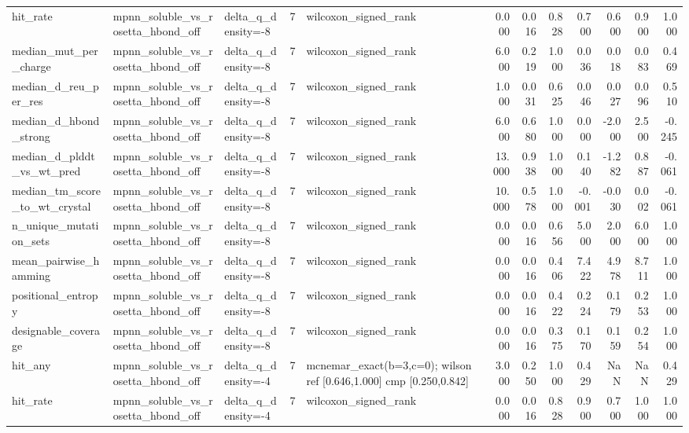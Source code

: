 \begin{table}
{\begin{tabular}{lllrlrrrrrrr}
hit\_rate & mpnn\_soluble\_vs\_rosetta\_hbond\_off & delta\_q\_density=-8 & 7 & wilcoxon\_signed\_rank & 0.000 & 0.016 & 0.828 & 0.700 & 0.600 & 0.900 & 1.000 \\
median\_mut\_per\_charge & mpnn\_soluble\_vs\_rosetta\_hbond\_off & delta\_q\_density=-8 & 7 & wilcoxon\_signed\_rank & 6.000 & 0.219 & 1.000 & 0.036 & 0.018 & 0.083 & 0.469 \\
median\_d\_reu\_per\_res & mpnn\_soluble\_vs\_rosetta\_hbond\_off & delta\_q\_density=-8 & 7 & wilcoxon\_signed\_rank & 1.000 & 0.031 & 0.625 & 0.046 & 0.027 & 0.096 & 0.510 \\
median\_d\_hbond\_strong & mpnn\_soluble\_vs\_rosetta\_hbond\_off & delta\_q\_density=-8 & 7 & wilcoxon\_signed\_rank & 6.000 & 0.680 & 1.000 & 0.000 & -2.000 & 2.500 & -0.245 \\
median\_d\_plddt\_vs\_wt\_pred & mpnn\_soluble\_vs\_rosetta\_hbond\_off & delta\_q\_density=-8 & 7 & wilcoxon\_signed\_rank & 13.000 & 0.938 & 1.000 & 0.140 & -1.282 & 0.887 & -0.061 \\
median\_tm\_score\_to\_wt\_crystal & mpnn\_soluble\_vs\_rosetta\_hbond\_off & delta\_q\_density=-8 & 7 & wilcoxon\_signed\_rank & 10.000 & 0.578 & 1.000 & -0.001 & -0.030 & 0.002 & -0.061 \\
n\_unique\_mutation\_sets & mpnn\_soluble\_vs\_rosetta\_hbond\_off & delta\_q\_density=-8 & 7 & wilcoxon\_signed\_rank & 0.000 & 0.016 & 0.656 & 5.000 & 2.000 & 6.000 & 1.000 \\
mean\_pairwise\_hamming & mpnn\_soluble\_vs\_rosetta\_hbond\_off & delta\_q\_density=-8 & 7 & wilcoxon\_signed\_rank & 0.000 & 0.016 & 0.406 & 7.422 & 4.978 & 8.711 & 1.000 \\
positional\_entropy & mpnn\_soluble\_vs\_rosetta\_hbond\_off & delta\_q\_density=-8 & 7 & wilcoxon\_signed\_rank & 0.000 & 0.016 & 0.422 & 0.224 & 0.179 & 0.253 & 1.000 \\
designable\_coverage & mpnn\_soluble\_vs\_rosetta\_hbond\_off & delta\_q\_density=-8 & 7 & wilcoxon\_signed\_rank & 0.000 & 0.016 & 0.375 & 0.170 & 0.159 & 0.254 & 1.000 \\
hit\_any & mpnn\_soluble\_vs\_rosetta\_hbond\_off & delta\_q\_density=-4 & 7 & mcnemar\_exact(b=3,c=0); wilson ref [0.646,1.000] cmp [0.250,0.842] & 3.000 & 0.250 & 1.000 & 0.429 & NaN & NaN & 0.429 \\
hit\_rate & mpnn\_soluble\_vs\_rosetta\_hbond\_off & delta\_q\_density=-4 & 7 & wilcoxon\_signed\_rank & 0.000 & 0.016 & 0.828 & 0.900 & 0.700 & 1.000 & 1.000 \\

\end{tabular}}
\end{table}
